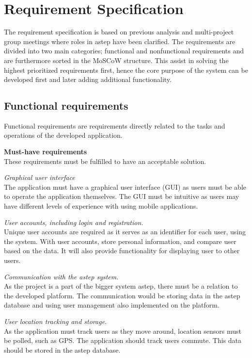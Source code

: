\section{Requirement Specification}\label{sec:req}
The requirement specification is based on previous analysis and multi-project group meetings where roles in \gls{astep} have been clarified.
The requirements are divided into two main categories; functional and nonfunctional requirements and are furthermore sorted in the MoSCoW \cite{moscow} structure.
This assist in solving the highest prioritized requirements first, hence the core purpose of the system can be developed first and later adding additional functionality.

\subsection{Functional requirements}
Functional requirements are requirements directly related to the tasks and operations of the developed application.

\textbf{Must-have requirements}\\
These requirements must be fulfilled to have an acceptable solution.

\textit{Graphical user interface}\\
The application must have a graphical user interface (GUI) as users must be able to operate the application themselves. 
The GUI must be intuitive as users may have different levels of experience with using mobile applications.

\textit{User accounts, including login and registration.}\\
Unique user accounts are required as it serves as an identifier for each user, using the system. 
With user accounts, store personal information, and compare user based on the data. 
It will also provide functionality for displaying user to other users.

\textit{Communication with the \gls{astep} system.}\\
As the project is a part of the bigger system \gls{astep}, there must be a relation to the developed platform. 
The communication would be storing data in the \gls{astep} database and using user management also implemented on the platform.

\textit{User location tracking and storage.}\\
As the application must track users as they move around, location sensors must be polled, such as GPS. 
The application should track users commute.
This data should be stored in the \gls{astep} database.

